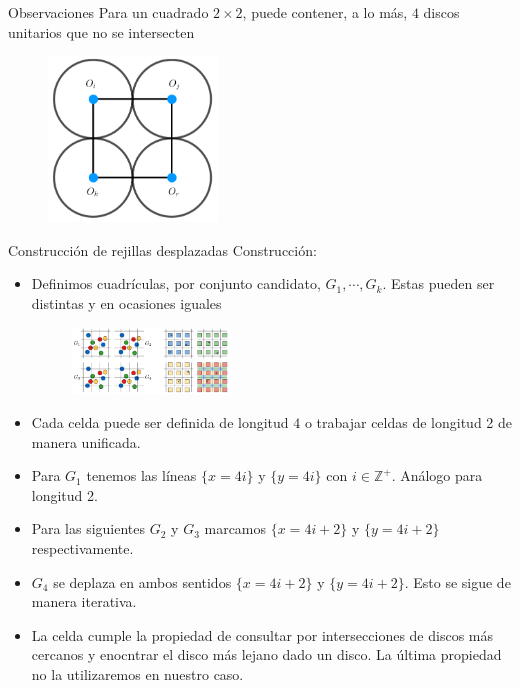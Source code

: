 \begin{frame}{Observaciones}
  Para un cuadrado $2 \times 2$, puede contener,
  a lo más, $4$ discos unitarios que no se intersecten
  \begin{figure}  
    \centering
    \includegraphics[width=0.4\textwidth]{./Images/4.png}
  \end{figure}
\end{frame}

\begin{frame}{Construcción de rejillas desplazadas}
 Construcción:
  \begin{itemize}[<+->]
  \item Definimos cuadrículas, por conjunto candidato, $G_1, \dotsm, G_k$. Estas pueden
    ser distintas y en ocasiones iguales
    \begin{figure}  
      \centering
      \includegraphics[width=0.4\textwidth]{./Images/cuadricula.png}
    \end{figure}
  \item Cada celda puede ser definida de longitud $4$ o trabajar celdas de
    longitud 2 de manera unificada.
  \item Para $G_1$ tenemos las líneas $\{x = 4i\}$ y $\{y = 4i\}$ con
    $i \in \mathbb{Z}^+$. Análogo para longitud 2.
  \item Para las siguientes $G_2$ y $G_3$ marcamos $\{x = 4i + 2\}$ y $\{y = 4i + 2\}$
    respectivamente.
  \item $G_4$ se deplaza en ambos sentidos $\{x = 4i + 2\}$ y $\{y = 4i + 2\}$. Esto se
    sigue de manera iterativa.
  \item La celda cumple la propiedad de consultar por intersecciones de discos más cercanos
    y enocntrar el disco más lejano dado un disco. La última propiedad no la utilizaremos en
    nuestro caso.
  \end{itemize}
\end{frame}

